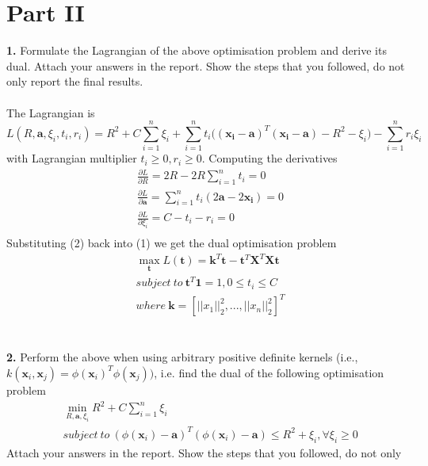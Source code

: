 \documentclass[a4paper]{article}
\begin{document}
\section*{Part II}
\textbf{1.} Formulate the Lagrangian of the above optimisation problem and derive its dual.
Attach your answers in the report. Show the steps that you followed, do not only
report the final results.\\
\\
The Lagrangian is
\begin{equation}
    L(R,\bm a,\xi_i,t_i,r_i) = R^2 + C\sum_{i=1}^{n}\xi_i + \sum_{i=1}^{n}t_i\big((\bm{x_i}-\bm{a})^T(\bm{x_i}-\bm{a})-R^2-\xi_i\big) - \sum_{i=1}^{n}r_i\xi_i
\end{equation}
with Lagrangian multiplier $t_i \geq 0, r_i \geq 0$. Computing the derivatives
\begin{equation}
    \begin{aligned}
        &\frac{\partial L}{\partial R} = 2R - 2R \sum_{i=1}^{n}t_i = 0 \\
        &\frac{\partial L}{\partial \bm a} = \sum_{i=1}^{n}t_i(2\bm a - 2\bm{x_i})=0\\
        &\frac{\partial L}{\partial \xi_i} = C-t_i-r_i = 0\\
    \end{aligned}
\end{equation}
Substituting (2) back into (1) we get the dual optimisation problem
\begin{equation}
    \begin{aligned}
        &\max_{\bm{t}}L(\bm t) = \bm k^T \bm t - \bm{t}^T\bm{X}^T\bm{Xt}\\
        & subject\ to\ \bm t^T\bm 1 = 1, 0 \leq t_i \leq C\\
        & where\ \bm k = [||x_1||_2^2, ... ,||x_n||_2^2]^T
    \end{aligned}
\end{equation}
\\
\\
\textbf{2.} Perform the above when using arbitrary positive definite kernels (i.e., $k(\bm x_i, \bm x_j) =
\phi(\bm x_i)^T\phi(\bm x_j)) $, i.e. find the dual of the following optimisation problem
\[
\begin{aligned}
    &\min_{R,\bm a,\xi_i} R^2 + C\sum^n_{i=1}\xi_i \\
    & subject\ to\ (\phi(\bm x_i) - \bm a)^T (\phi(\bm x_i) - \bm a) \leq R^2 + \xi_i, \forall \xi_i \geq 0
\end{aligned}
\]
Attach your answers in the report. Show the steps that you followed, do not only
\end{document}

